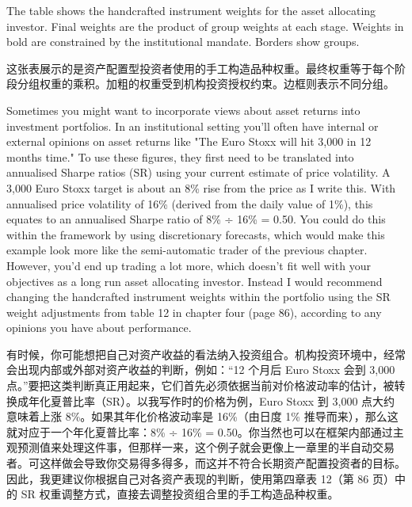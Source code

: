 \begin{englishblock} The table shows the handcrafted instrument weights for the asset allocating investor. Final weights are the product of group weights at each stage. Weights in bold are constrained by the institutional mandate. Borders show groups. \end{englishblock}

\begin{chineseblock}这张表展示的是资产配置型投资者使用的手工构造品种权重。最终权重等于每个阶段分组权重的乘积。加粗的权重受到机构投资授权约束。边框则表示不同分组。\end{chineseblock}


\begin{englishblock} Sometimes you might want to incorporate views about asset returns into investment portfolios. In an institutional setting you'll often have internal or external opinions on asset returns like "The Euro Stoxx will hit 3,000 in 12 months time." To use these figures, they first need to be translated into annualised Sharpe ratios (SR) using your current estimate of price volatility. A 3,000 Euro Stoxx target is about an 8\% rise from the price as I write this. With annualised price volatility of 16\% (derived from the daily value of 1\%), this equates to an annualised Sharpe ratio of 8\% ÷ 16\% = 0.50. You could do this within the framework by using discretionary forecasts, which would make this example look more like the semi-automatic trader of the previous chapter. However, you'd end up trading a lot more, which doesn't fit well with your objectives as a long run asset allocating investor. Instead I would recommend changing the handcrafted instrument weights within the portfolio using the SR weight adjustments from table 12 in chapter four (page 86), according to any opinions you have about performance. \end{englishblock}

\begin{chineseblock}有时候，你可能想把自己对资产收益的看法纳入投资组合。机构投资环境中，经常会出现内部或外部对资产收益的判断，例如：“12 个月后 Euro Stoxx 会到 3,000 点。”要把这类判断真正用起来，它们首先必须依据当前对价格波动率的估计，被转换成年化夏普比率（SR）。以我写作时的价格为例，Euro Stoxx 到 3,000 点大约意味着上涨 8\%。如果其年化价格波动率是 16\%（由日度 1\% 推导而来），那么这就对应于一个年化夏普比率：8\% ÷ 16\% = 0.50。你当然也可以在框架内部通过主观预测值来处理这件事，但那样一来，这个例子就会更像上一章里的半自动交易者。可这样做会导致你交易得多得多，而这并不符合长期资产配置投资者的目标。因此，我更建议你根据自己对各资产表现的判断，使用第四章表 12（第 86 页）中的 SR 权重调整方式，直接去调整投资组合里的手工构造品种权重。\end{chineseblock}

